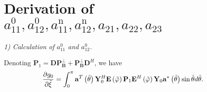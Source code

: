 \documentclass[12pt, draftclsnofoot, onecolumn]{IEEEtran}
\begin{document}
\appendices
\section{Derivation of $a_{11}^{0}, a_{12}^{0}, a_{11}^{\mathrm{n}}, a_{12}^{\mathrm{n}}, a_{21}, a_{22}, a_{23}$}{\label{MSEDerivation}}

\emph{1) Calculation of $a_{11}^{0}$ and $a_{12}^{0}$.}

Denoting $ \mathbf{P}_{1} = \mathbf{DP}_{\mathbf{B}}^{\bot }+\mathbf{P}_{\mathbf{B}}^{\bot }{{\mathbf{D}}^{H}} $, we have
\begin{align}
\frac{\partial {{g}_{0}}}{\partial \tilde{\xi }} & =\int_{0}^{\rm{\pi}} {{\mathbf{a}}^{T}}\left( {\tilde{\theta }} \right)\mathbf{Y}_{0}^{H}\mathbf{E}\left( {\tilde{\varphi }} \right) \mathbf{P}_{1} {{\mathbf{E}}^{H}}\left( {\tilde{\varphi }} \right){{\mathbf{Y}}_{0}}{{\mathbf{a}}^{*}}\left( {\tilde{\theta }} \right) \sin \tilde{\theta }d\tilde{\theta }.
\end{align}
\end{document}
